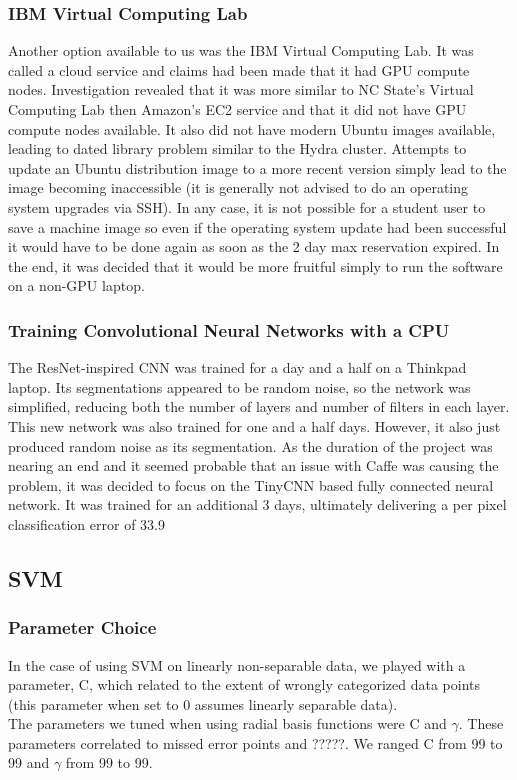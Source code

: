 \documentclass[12pt]{article}
\begin{document}
\subsubsection{IBM Virtual Computing Lab}
	Another option available to us was the IBM Virtual Computing Lab. It was called a cloud service and claims had been made that it had GPU compute nodes.  Investigation revealed that it was more similar to NC State's Virtual Computing Lab then Amazon's EC2 service and that it did not have GPU compute nodes available.  It also did not have modern Ubuntu images available, leading to dated library problem similar to the Hydra cluster.  Attempts to update an Ubuntu distribution image to a more recent version simply lead to the image becoming inaccessible (it is generally not advised to do an operating system upgrades via SSH).  In any case, it is not possible for a student user to save a machine image so even if the operating system update had been successful it would have to be done again as soon as the 2 day max reservation expired.  In the end, it was decided that it would be more fruitful simply to run the software on a non-GPU laptop.

	\subsubsection{Training Convolutional Neural Networks with a CPU}

	The ResNet-inspired CNN was trained for a day and a half on a Thinkpad laptop.  Its segmentations appeared to be random noise, so the network was simplified, reducing both the number of layers and  number of filters in each layer.  This new network was also trained for one and a half days.  However, it also just produced random noise as its segmentation.  As the duration of the project was nearing an end and it seemed probable that an issue with Caffe was causing the problem, it was decided to focus on the TinyCNN based fully connected neural network.  It was trained for an additional 3 days, ultimately delivering a per pixel classification error of 33.9%
	\subsection{SVM}
	\subsubsection{Parameter Choice} In the case of using SVM on linearly non-separable data, we played with a parameter, C, which related to the extent of wrongly categorized data points (this parameter when set to 0 assumes linearly separable data).\\
	The parameters we tuned when using radial basis functions were C and $\gamma$. These parameters correlated to missed error points and ?????.  We ranged C from 99 to 99 and $\gamma$ from 99 to 99.
\end{document}
